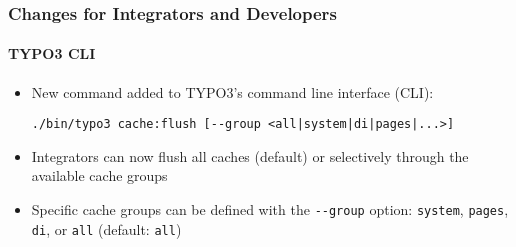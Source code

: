 %

\begin{frame}[fragile]
	\frametitle{Changes for Integrators and Developers}
	\framesubtitle{TYPO3 CLI}


	\begin{itemize}
		\item New command added to TYPO3's command line interface (CLI):
\begin{lstlisting}
./bin/typo3 cache:flush [--group <all|system|di|pages|...>]
\end{lstlisting}
		\item Integrators can now flush all caches (default) or selectively
			through the available cache groups
		\item Specific cache groups can be defined with the
			\texttt{-}\texttt{-group} option:\newline
			\small\texttt{system}, \texttt{pages}, \texttt{di}, or \texttt{all} (default: \texttt{all})\normalsize
	\end{itemize}
\end{frame}

